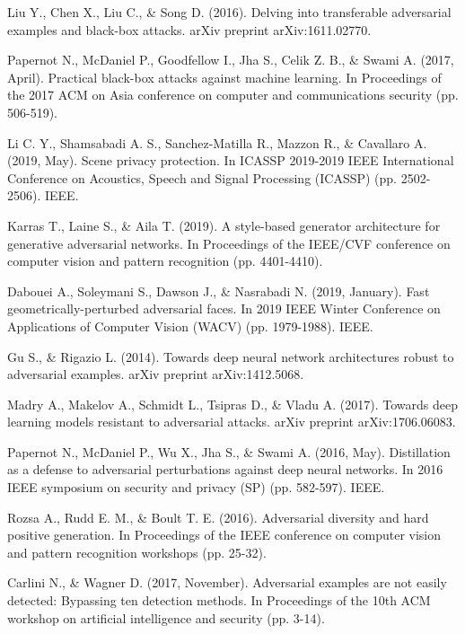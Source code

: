 \begin{thebibliography}{}
Liu Y., Chen X., Liu C., \& Song D. (2016). Delving into transferable adversarial examples and black-box attacks. arXiv preprint arXiv:1611.02770.

Papernot N., McDaniel P., Goodfellow I., Jha S., Celik Z. B., \& Swami A. (2017, April). Practical black-box attacks against machine learning. In Proceedings of the 2017 ACM on Asia conference on computer and communications security (pp. 506-519).

Li C. Y., Shamsabadi A. S., Sanchez-Matilla R., Mazzon R., \& Cavallaro A. (2019, May). Scene privacy protection. In ICASSP 2019-2019 IEEE International Conference on Acoustics, Speech and Signal Processing (ICASSP) (pp. 2502-2506). IEEE.

Karras T., Laine S., \& Aila T. (2019). A style-based generator architecture for generative adversarial networks. In Proceedings of the IEEE/CVF conference on computer vision and pattern recognition (pp. 4401-4410).

Dabouei A., Soleymani S., Dawson J., \& Nasrabadi N. (2019, January). Fast geometrically-perturbed adversarial faces. In 2019 IEEE Winter Conference on Applications of Computer Vision (WACV) (pp. 1979-1988). IEEE.

Gu S., \& Rigazio L. (2014). Towards deep neural network architectures robust to adversarial examples. arXiv preprint arXiv:1412.5068.

Madry A., Makelov A., Schmidt L., Tsipras D., \& Vladu A. (2017). Towards deep learning models resistant to adversarial attacks. arXiv preprint arXiv:1706.06083.

Papernot N., McDaniel P., Wu X., Jha S., \& Swami A. (2016, May). Distillation as a defense to adversarial perturbations against deep neural networks. In 2016 IEEE symposium on security and privacy (SP) (pp. 582-597). IEEE.

Rozsa A., Rudd E. M., \& Boult T. E. (2016). Adversarial diversity and hard positive generation. In Proceedings of the IEEE conference on computer vision and pattern recognition workshops (pp. 25-32).

Carlini N., \& Wagner D. (2017, November). Adversarial examples are not easily detected: Bypassing ten detection methods. In Proceedings of the 10th ACM workshop on artificial intelligence and security (pp. 3-14).


\end{thebibliography}
